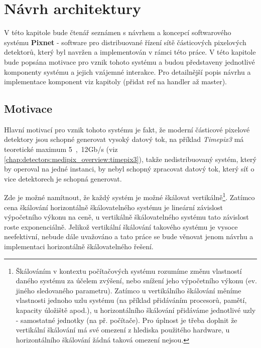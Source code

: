

\chapter{Návrh architektury}\label{chap:arch}
V této kapitole bude čtenář seznámen s návrhem a koncepcí softwarového systému \textbf{Pixnet} - software pro distribuované řízení sítě částicových pixelových detektorů, který byl navržen a implementován v rámci této práce. V této kapitole bude popsána motivace pro vznik tohoto systému a budou představeny jednotlivé komponenty systému a jejich vzájemné interakce. Pro detailnější popis návrhu a implementace komponent viz kapitoly \todo (přidat ref na handler až master).

\section{Motivace}
Hlavní motivací pro vznik tohoto systému je fakt, že moderní částicové pixelové detektory jsou schopné generovat vysoký datový tok, na příklad \textit{Timepix3} má teoretické maximum \unit{5,12}{Gb/s} (viz \ref{chap:detectors:medipix_overview:timepix3}), takže nedistribuovaný systém, který by operoval na jedné instanci, by nebyl schopný zpracovat datový tok, který síť o vice detektorech je schopná generovat. 

Zde je možné namítnout, že každý systém je možné škálovat vertikálně\footnote{Škálováním v kontextu počítačových systému rozumíme změnu vlastností daného systému za účelem zvýšení, nebo snížení jeho výpočetního výkonu (ev. jiného sledovaného parametru). Zatímco u vertikálního škálování měníme vlastnosti jednoho uzlu systému (na příklad přidáváním procesorů, pamětí, kapacity úložiště apod.), u horizontálního škálování přidáváme jednotlivé uzly - samostatné  jednotky (na př. počítače). Pro úplnost je třeba doplnit že vertikální škálování má své omezení z hlediska použitého hardware, u horizontálního škálování žádná taková omezení nejsou.}. Zatímco cena škálování horizontálně škálovatelného systému je lineární závislost výpočetního výkonu na ceně, u vertikálně škálovatelného systému tato závislost roste exponenciálně. Jelikož vertikální škálování takového systému je  vysoce neefektivní, nebude dále uvažováno a tato práce se bude věnovat jenom návrhu a implementaci horizontálně škálovatelného řešení.

